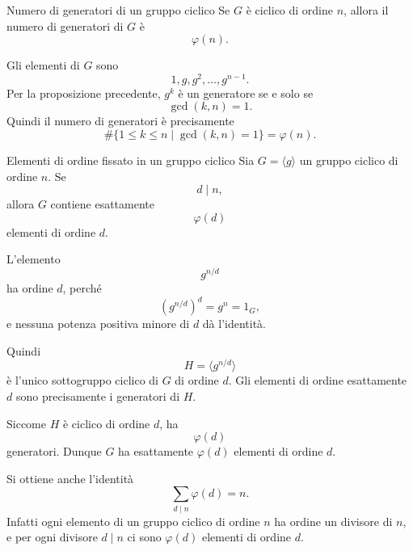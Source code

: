 \documentclass[a4paper]{article}
\begin{document}
\begin{radioactive}
\begin{snippetcorollary}{Numero di generatori di un gruppo ciclico}
    Se \(G\) è ciclico di ordine \(n\), allora il numero di generatori di \(G\) è
    \[
        \varphi(n).
    \]
\end{snippetcorollary}
\end{radioactive}

\begin{radioactive}
\begin{snippetproof}{}
    Gli elementi di \(G\) sono
    \[
        1,g,g^2,\ldots,g^{n-1}.
    \]
    Per la proposizione precedente, \(g^k\) è un generatore se e solo se
    \[
        \gcd(k,n)=1.
    \]
    Quindi il numero di generatori è precisamente
    \[
        \#\{1\leq k\leq n\mid \gcd(k,n)=1\}
        =
        \varphi(n).
    \]
\end{snippetproof}
\end{radioactive}

\begin{radioactive}
\begin{snippetproposition}{Elementi di ordine fissato in un gruppo ciclico}
    Sia \(G=\langle g\rangle\) un gruppo ciclico di ordine \(n\). Se
    \[
        d\mid n,
    \]
    allora \(G\) contiene esattamente
    \[
        \varphi(d)
    \]
    elementi di ordine \(d\).
\end{snippetproposition}
\end{radioactive}

\begin{radioactive}
\begin{snippetproof}{}
    L'elemento
    \[
        g^{n/d}
    \]
    ha ordine \(d\), perché
    \[
        \left(g^{n/d}\right)^d=g^n=1_G,
    \]
    e nessuna potenza positiva minore di \(d\) dà l'identità.

    Quindi
    \[
        H=\langle g^{n/d}\rangle
    \]
    è l'unico sottogruppo ciclico di \(G\) di ordine \(d\). Gli elementi di ordine esattamente \(d\) sono precisamente i generatori di \(H\).

    Siccome \(H\) è ciclico di ordine \(d\), ha
    \[
        \varphi(d)
    \]
    generatori. Dunque \(G\) ha esattamente \(\varphi(d)\) elementi di ordine \(d\).
\end{snippetproof}
\end{radioactive}

\begin{radioactive}
\begin{snippetremark}{}
    Si ottiene anche l'identità
    \[
        \sum_{d\mid n}\varphi(d)=n.
    \]
    Infatti ogni elemento di un gruppo ciclico di ordine \(n\) ha ordine un divisore di \(n\), e per ogni divisore \(d\mid n\) ci sono \(\varphi(d)\) elementi di ordine \(d\).
\end{snippetremark}
\end{radioactive}
\end{document}
